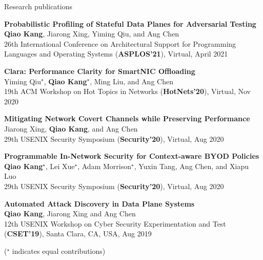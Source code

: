 \documentclass{resume} %
\begin{document}
\begin{rSection}{Research publications}


\item {\bf Probabilistic Profiling of Stateful Data Planes for Adversarial Testing}\\
{\bf Qiao Kang}, Jiarong Xing, Yiming Qiu, and Ang Chen \\
26th International Conference on Architectural Support for Programming Languages and Operating Systems ({\bf ASPLOS'21}), Virtual, April 2021

\vspace{3mm}

\item {\bf Clara: Performance Clarity for SmartNIC Offloading}\\
Yiming Qiu$^\star$, {\bf Qiao Kang$^\star$}, Ming Liu, and Ang Chen \\
19th ACM Workshop on Hot Topics in Networks ({\bf HotNets'20}), Virtual, Nov 2020

\vspace{3mm}

\item {\bf Mitigating Network Covert Channels while Preserving Performance}\\
Jiarong Xing, {\bf Qiao Kang}, and Ang Chen\\
29th USENIX Security Symposium ({\bf Security'20}), Virtual, Aug 2020

\vspace{3mm}

\item {\bf Programmable In-Network Security for Context-aware BYOD Policies}\\
{\bf Qiao Kang$^\star$}, Lei Xue$^\star$, Adam Morrison$^\star$, Yuxin Tang, Ang Chen, and Xiapu Luo\\
29th USENIX Security Symposium ({\bf Security'20}), Virtual, Aug 2020

\vspace{3mm}

\item {\bf Automated Attack Discovery in Data Plane Systems}\\
{\bf Qiao Kang}, Jiarong Xing and Ang Chen\\
12th USENIX Workshop on Cyber Security Experimentation and Test ({\bf CSET'19}), Santa Clara, CA, USA, Aug 2019

\vspace{1mm}

($^\star$ indicates equal contributions)

\vspace{2mm}

\end{rSection}
\end{document}
